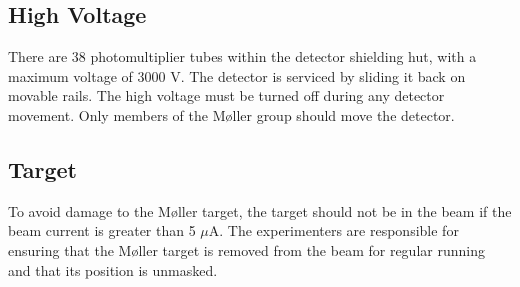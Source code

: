 \begin{safetyen}{50}{50}
\subsection{High Voltage}

There are 38 photomultiplier tubes within the detector
shielding hut, with a maximum voltage of 3000 V. The detector is serviced
by sliding it back on movable rails. The high voltage must be turned
off during any detector movement. Only members of the M{\o}ller group
should move the detector.\\

\subsection{Target}

To avoid damage to the M{\o}ller target, the target should not be in the beam 
if the beam current is greater than
5 $\mu$A. 
The experimenters
are responsible for ensuring that the M{\o}ller target is removed from the beam
for regular running and that its position is unmasked. \\

\end{safetyen}




